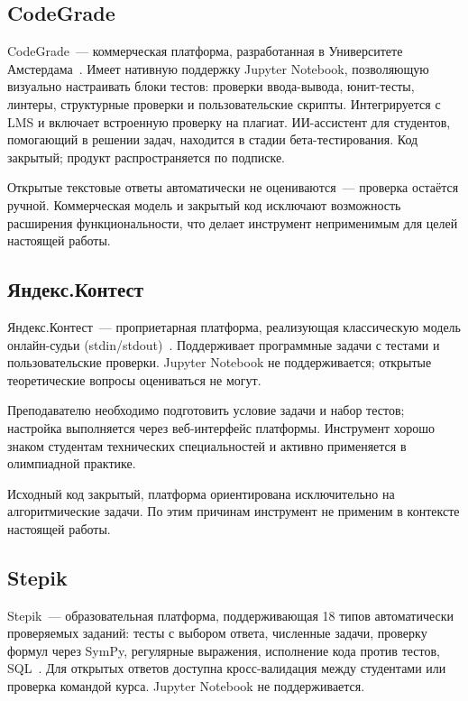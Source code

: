 \subsection{CodeGrade}

CodeGrade~--- коммерческая платформа, разработанная в Университете
Амстердама~\cite{codegrade}. Имеет нативную поддержку Jupyter Notebook,
позволяющую визуально настраивать блоки тестов: проверки ввода-вывода,
юнит-тесты, линтеры, структурные проверки и пользовательские скрипты.
Интегрируется с LMS и включает встроенную проверку на плагиат. ИИ-ассистент
для студентов, помогающий в решении задач, находится в стадии бета-тестирования. 
Код закрытый; продукт распространяется по подписке.

Открытые текстовые ответы автоматически не оцениваются~--- проверка остаётся ручной.
Коммерческая модель и закрытый код исключают возможность расширения
функциональности, что делает инструмент неприменимым для целей настоящей работы.

\subsection{Яндекс.Контест}

Яндекс.Контест~--- проприетарная платформа, реализующая классическую модель
онлайн-судьи (stdin/stdout)~\cite{yandex_contest}. Поддерживает программные
задачи с тестами и пользовательские проверки. Jupyter Notebook не
поддерживается; открытые теоретические вопросы оцениваться не могут.

Преподавателю необходимо подготовить условие задачи и набор тестов; настройка
выполняется через веб-интерфейс платформы. Инструмент хорошо знаком студентам
технических специальностей и активно применяется в олимпиадной практике.

Исходный код закрытый, платформа ориентирована
исключительно на алгоритмические задачи. По этим
причинам инструмент не применим в контексте настоящей работы.

\subsection{Stepik}

Stepik~--- образовательная платформа, поддерживающая 18 типов автоматически
проверяемых заданий: тесты с выбором ответа, численные задачи, проверку формул
через SymPy, регулярные выражения, исполнение кода против тестов,
SQL~\cite{stepik}. Для открытых ответов доступна кросс-валидация между
студентами или проверка командой курса. Jupyter Notebook не поддерживается.

